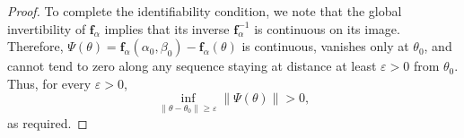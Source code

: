 \documentclass[10pt,a4paper]{amsart}
\begin{document}
\begin{proof}
To complete the identifiability condition, we note that the global invertibility of \(\boldsymbol{f}_\alpha\) implies that its inverse \(\boldsymbol{f}_\alpha^{-1}\) is continuous on its image. Therefore, \(\Psi(\theta) = \boldsymbol{f}_\alpha(\alpha_0, \beta_0) - \boldsymbol{f}_\alpha(\theta)\) is continuous, vanishes only at \(\theta_0\), and cannot tend to zero along any sequence staying at distance at least \(\varepsilon > 0\) from \(\theta_0\). Thus, for every \(\varepsilon > 0\),
\[
\inf_{\|\theta - \theta_0\| \ge \varepsilon} \|\Psi(\theta)\| > 0,
\]
as required.
\end{proof}
\end{document}
